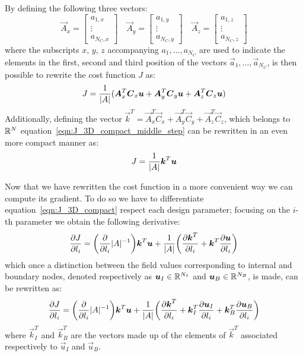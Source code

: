 By defining the following three vectors:
\begin{equation}
	\vec{A}_x =
	\begin{bmatrix}
		a_{1,x}   \\
		\vdots			\\
		a_{N_C,x}
	\end{bmatrix} \quad
	\vec{A}_y =
	\begin{bmatrix}
		a_{1,y}   \\
		\vdots			\\
		a_{N_C,y}
	\end{bmatrix} \quad
	\vec{A}_z =
	\begin{bmatrix}
		a_{1,z}   \\
		\vdots			\\
		a_{N_C,z}
	\end{bmatrix}
\end{equation}
where the subscripts $x$, $y$, $z$ accompanying $a_1, \dots, a_{N_C}$ are used to indicate the elements in the first, second and third position of the vectors $\vec{a}_1, \dots, \vec{a}_{N_C}$, is then possible to rewrite the cost function $J$ as:
\begin{equation}
	\label{eqn:J_3D_compact_middle_step}
	J = \frac{1}{\lvert A\rvert} ( \boldsymbol{A}_x^T \boldsymbol{C}_x \boldsymbol{u} + \boldsymbol{A}_y^T \boldsymbol{C}_y \boldsymbol{u} + \boldsymbol{A}_z^T \boldsymbol{C}_z \boldsymbol{u})
\end{equation}
Additionally, defining the vector $\vec{k}^T = \vec{A}_x^T \vec{C}_x + \vec{A}_y^T \vec{C}_y + \vec{A}_z^T \vec{C}_z$, which belongs to $\mathbb{R}^{N}$ equation~\eqref{eqn:J_3D_compact_middle_step} can be rewritten in an even more compact manner as:
\begin{equation}
	\label{eqn:J_3D_compact}
	J = \frac{1}{\lvert A\rvert} \boldsymbol{k}^T \boldsymbol{u}
\end{equation}

\smallskip
Now that we have rewritten the cost function in a more convenient way we can compute its gradient. To do so we have to differentiate equation~\eqref{eqn:J_3D_compact} respect each design parameter; focusing on the $i$-th parameter we obtain the following derivative:
\begin{equation}
	\label{eqn:diff_J_3D_single_param_mid_step}
	\frac{\partial J}{\partial l_i} = \biggl( \frac{\partial}{\partial l_i} \lvert A\rvert^{-1} \biggr) \boldsymbol{k}^T \boldsymbol{u} + \frac{1}{\lvert A\rvert} \biggl( \frac{\partial \boldsymbol{k}^T}{\partial l_i} + \boldsymbol{k}^T \frac{\partial \boldsymbol{u}}{\partial l_i} \biggr)
\end{equation}
which once a distinction between the field values corresponding to internal and boundary nodes, denoted respectively as $\boldsymbol{u}_I \in \mathbb{R}^{N_I}$ and $\boldsymbol{u}_B \in \mathbb{R}^{N_B}$, is made, can be rewritten as:
\begin{equation}
	\frac{\partial J}{\partial l_i} = \biggl( \frac{\partial}{\partial l_i} \lvert A\rvert^{-1} \biggr) \boldsymbol{k}^T \boldsymbol{u} + \frac{1}{\lvert A\rvert} \biggl( \frac{\partial \boldsymbol{k}^T}{\partial l_i} + \boldsymbol{k}_I^T \frac{\partial \boldsymbol{u}_I}{\partial l_i} + \boldsymbol{k}_B^T \frac{\partial \boldsymbol{u}_B}{\partial l_i}\biggr)
\end{equation}
where $\vec{k}_I^T$ and $\vec{k}_B^T$ are the vectors made up of the elements of $\vec{k}^T$ associated respectively to $\vec{u}_I$ and $\vec{u}_B$.

